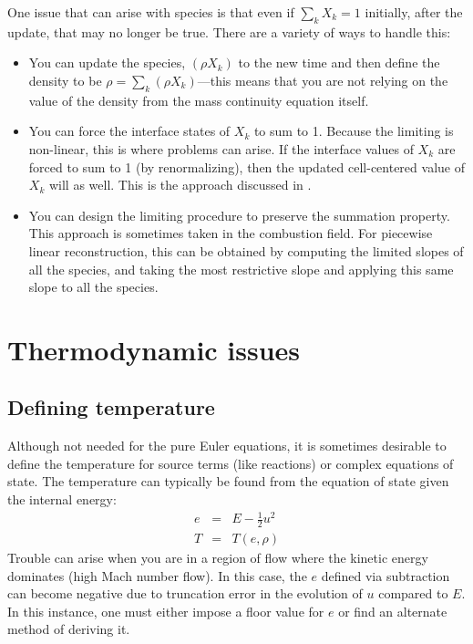 One issue that can arise with species is that even if $\sum_k X_k = 1$
initially, after the update, that may no longer be true.  There are a
variety of ways to handle this:
\begin{itemize}
\item You can update the species, $(\rho X_k)$ to the new time and then
define the density to be $\rho = \sum_k (\rho X_k)$---this means that
you are not relying on the value of the density from the mass continuity
equation itself.

\item You can force the interface states of $X_k$ to sum to 1.  Because
the limiting is non-linear, this is where problems can arise.  If the
interface values of $X_k$ are forced to sum to 1 (by renormalizing), then
the updated cell-centered value of $X_k$ will as well.  This is the
approach discussed in \cite{plewamuller:1999}.

\item You can design the limiting procedure to preserve the summation
property.  This approach is sometimes taken in the combustion field.
For piecewise linear reconstruction, this can be obtained by computing
the limited slopes of all the species, and taking the most restrictive
slope and applying this same slope to all the species.
\end{itemize}





\section{Thermodynamic issues}

\subsection{Defining temperature}

  Although not needed for the pure
  Euler equations, it is sometimes desirable to define the temperature
  for source terms (like reactions) or complex equations of state.
  The temperature can typically be found from the equation of state
  given the internal energy:
  \begin{eqnarray}
  e &=& E - \frac{1}{2} u^2 \\
  T &=& T(e, \rho)
  \end{eqnarray}
  Trouble can arise when you are in a region of flow where the kinetic
  energy dominates (high Mach number flow).  In this case, the $e$ defined
  via subtraction can become negative due to truncation error in the
  evolution of $u$ compared to $E$.  In this instance, one must either
  impose a floor value for $e$ or find an alternate method of deriving
  it.

